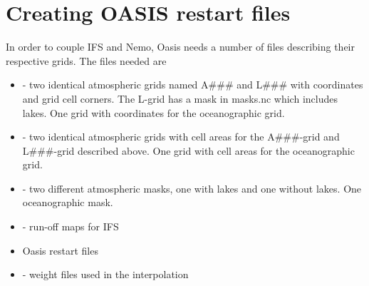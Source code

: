 % 
% 
% 
% 


\section{Creating OASIS restart files}

In order to couple IFS and Nemo, Oasis needs a number of files describing their respective grids. The files needed are

\begin{itemize}
  \item {} - two identical atmospheric grids named A\#\#\# and L\#\#\# with coordinates and grid cell corners. The L-grid has a mask in masks.nc which includes lakes. One grid with coordinates for the oceanographic grid.
  \item {} - two identical atmospheric grids with cell areas for the A\#\#\#-grid and L\#\#\#-grid described above. One grid with cell areas for the oceanographic grid.
  \item {} - two different atmospheric masks, one with lakes and one without lakes. One oceanographic mask.
  \item {} - run-off maps for IFS
  \item Oasis restart files
  \item {} - weight files used in the interpolation
\end{itemize}


